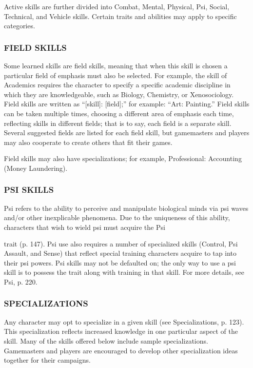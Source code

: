 Active skills are further divided into Combat,
Mental, Physical, Psi, Social, Technical, and Vehicle
skills. Certain traits and abilities may apply to specific
categories.


 \subsubsection{FIELD SKILLS}
Some learned skills are field skills, meaning that when
this skill is chosen a particular field of emphasis must
also be selected. For example, the skill of Academics
requires the character to specify a specific academic
discipline in which they are knowledgeable, such as
Biology, Chemistry, or Xenosociology. Field skills are
written as “[skill]: [field];” for example: “Art: Painting.” Field skills can be taken multiple times, choosing
a different area of emphasis each time, reflecting skills
in different fields; that is to say, each field is a separate
skill. Several suggested fields are listed for each field
skill, but gamemasters and players may also cooperate
to create others that fit their games.

Field skills may also have specializations; for example, Professional: Accounting (Money Laundering).


 \subsubsection{PSI SKILLS}
Psi refers to the ability to perceive and manipulate
biological minds via psi waves and/or other inexplicable phenomena. Due to the uniqueness of this ability,
characters that wish to wield psi must acquire the Psi

trait (p. 147). Psi use also requires a number of specialized skills (Control, Psi Assault, and Sense) that reflect
special training characters acquire to tap into their psi
powers. Psi skills may not be defaulted on; the only
way to use a psi skill is to possess the trait along with
training in that skill. For more details, see Psi, p. 220.


 \subsubsection{SPECIALIZATIONS}
Any character may opt to specialize in a given skill
(see Specializations, p. 123). This specialization reflects
increased knowledge in one particular aspect of the
skill. Many of the skills offered below include sample
specializations. Gamemasters and players are encouraged to develop other specialization ideas together for
their campaigns.

